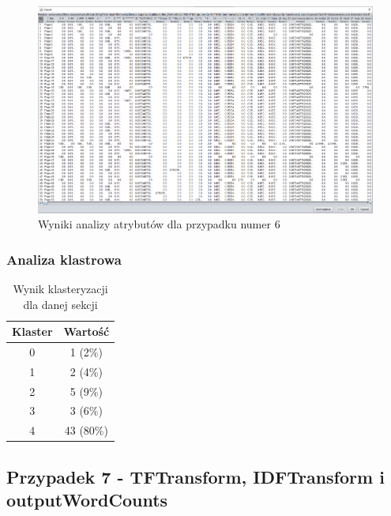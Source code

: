 \documentclass[../EDI_Task2_Karwowski_Kowalewski.tex]{subfiles}
\begin{document}
{{{            \begin{figure}[!htbp]
                \centering
                \includegraphics[width=\textwidth]{img/results2/weeia-case6.png}
                \caption{Wyniki analizy atrybutów dla przypadku numer 6}
            \end{figure}
            \FloatBarrier
        }

        \subsubsection{Analiza klastrowa} {

            \begin{table}[!htbp]
                \small
                \centering
                \begin{tabular}{|c|c|}
                    \hline
                    Klaster & Wartość \\ \hline
                    0   &   1 (2\%) \\
                    1   &   2 (4\%) \\
                    2   &   5 (9\%) \\
                    3   &   3 (6\%) \\
                    4   &  43 (80\%) \\ \hline
                \end{tabular}
                \caption{Wynik klasteryzacji dla danej sekcji}
            \end{table}
            \FloatBarrier
        }
    }

    \subsection{Przypadek 7 - TFTransform, IDFTransform i outputWordCounts} {

}}
\end{document}
